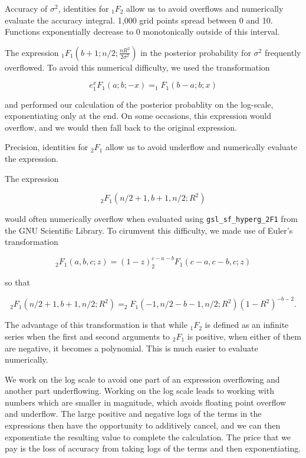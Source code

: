 \documentclass{amsart}[12pt]
\newcommand{\mgc}[1]{{\color{blue}#1}}
\begin{document}
\mgc{Accuracy of $\sigma^2$, identities for $_1 F_2$ allow us to avoid overflows and numerically evaluate the
accuracy integral. 1,000 grid points spread between 0 and 10. Functions exponentially decrease to 0
monotonically outside of this interval.
}

The expression $_1 F_1\left (b + 1; n/2; \frac{nR^2}{2 \sigma^2} \right)$ in the posterior
probability for $\sigma^2$ frequently overflowed. To avoid this numerical difficulty, we used the transformation

\[
	e^x _1 F_1(a; b; -x) = _1 F_1(b - a; b; x)
\]

and performed our calculation of the posterior probablity on the log-scale, exponentiating only at the end.
On some occasions, this expression would overflow, and we would then fall back to the original expression.

\mgc{
Precision, identities for $_2 F_1$ allow us to avoid underflow and numerically evaluate the expression.
}

The expression

\[
	_2 F_1(n/2 + 1, b + 1, n/2; R^2)
\]

would often numerically overflow when evaluated using \texttt{gsl\_sf\_hyperg\_2F1} from the GNU Scientific
Library. To cirumvent this difficulty, we made use of Euler's transformation

\[
	_2 F_1(a, b, c; z) = (1 - z)^{c - a - b} _2 F_1 (c - a, c - b, c; z)
\]

so that

\[
	_2 F_1(n/2 + 1, b + 1, n/2; R^2) = _2 F_1(-1, n/2 - b - 1, n/2; R^2) (1 - R^2)^{-b-2}.
\]

The advantage of this transformation is that while $_1 F_2$ is defined as an infinite series when the first
and second arguments to $_2 F_1$ is positive, when either of them are negative, it becomes a polynomial. This
is much easier to evaluate numerically.

We work on the log scale to avoid one part of an expression overflowing and another part underflowing. Working
on the log scale leads to working with numbers which are smaller in magnitude, which avoids floating point
overflow and underflow. The large positive and negative logs of the terms in the expressions then have the
opportunity to additively cancel, and we can then exponentiate the resulting value to complete the
calculation. The price that we pay is the loss of accuracy from taking logs of the terms and then
exponentiating.



\end{document}
